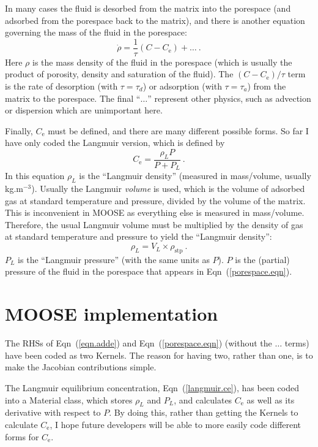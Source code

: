 \documentclass[]{scrreprt}
\begin{document}
In many cases the fluid is desorbed from the matrix into the porespace
(and adsorbed from the porespace back to the matrix), and there is
another equation governing the mass of the fluid in the porespace:
\begin{equation}
\dot{\rho} = \frac{1}{\tau}(C - C_{\mathrm{e}})
+ \ldots\ .
\label{porespace.eqn}
\end{equation}
Here $\rho$ is the mass density of the fluid in the porespace (which
is usually the product of porosity, density and saturation of the
fluid).  The $(C-C_{\mathrm{e}})/\tau$ term is the rate of desorption
(with $\tau=\tau_{d}$) or adsorption (with $\tau=\tau_{a}$)
from the matrix to the porespace.  The final ``$\ldots$'' represent
other physics, such as advection or dispersion which are unimportant
here.

Finally, $C_{\mathrm{e}}$ must be defined, and there are many
different possible forms.  So far I have only coded the Langmuir
version, which is defined by
\begin{equation}
C_{\mathrm{e}} = \frac{\rho_{L}P}{P+P_{L}} \ .
\label{langmuir.ce}
\end{equation}
In this equation $\rho_{L}$ is the ``Langmuir density'' (measured in
mass/volume, usually kg.m$^{-3}$).  Usually the Langmuir {\em volume}
is used, which is the volume of adsorbed gas at standard temperature
and pressure, divided by the volume of the matrix.  This is
inconvenient in MOOSE as everything else is measured in mass/volume.
Therefore, the usual Langmuir volume must be multiplied by the density
of gas at standard temperature and pressure to yield the ``Langmuir
density'':
\begin{equation}
\rho_{L} = V_{L}\times \rho_{\mathrm{stp}} \ .
\end{equation}
$P_{L}$ is the ``Langmuir pressure'' (with
the same units as $P$).  $P$ is the (partial) pressure of the fluid in
the porespace that appears in Eqn~(\ref{porespace.eqn}).



\chapter{MOOSE implementation}

The RHSs of Eqn~(\ref{eqn.adde}) and Eqn~(\ref{porespace.eqn}) (without
the $\ldots$ terms) have been coded as two Kernels.  The reason for
having two, rather than one, is to make the Jacobian contributions
simple.

The Langmuir equilibrium concentration, Eqn~(\ref{langmuir.ce}), has
been coded into a Material class, which stores $\rho_{L}$ and $P_{L}$,
and calculates $C_{\mathrm{e}}$ as well as its derivative with respect
to $P$.  By doing this, rather than getting the Kernels to calculate
$C_{\mathrm{e}}$, I hope future developers will be able to more
easily code different forms for $C_{\mathrm{e}}$.
\end{document}
